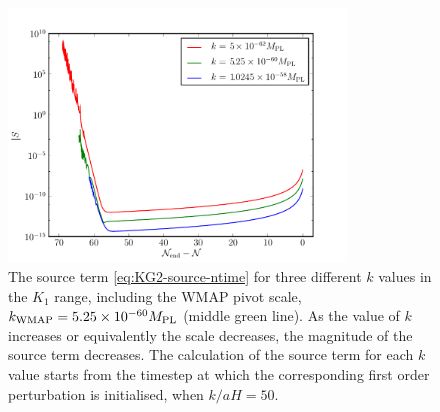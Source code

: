 \begin{figure}[htbp]
\centering
 \includegraphics[width=0.8\textwidth]{numerical/graphs/src-3ks-large}
\caption[Source term at three different values of $k$]{The source term
\eqref{eq:KG2-source-ntime} for three different $k$
values in the $K_1$ range, including the WMAP
pivot scale, $k_\mathrm{WMAP}=5.25\times 10^{-60}M_{\mathrm{PL}}$ (middle green line). As the value of $k$
increases or equivalently the scale decreases, the magnitude of the source term
decreases. The calculation of the source term for each $k$ value starts from the
timestep at which the corresponding first order perturbation is initialised, \iec
when $k/aH = 50$.
}
\label{fig:src-3ks}
\end{figure}
% 
% 

